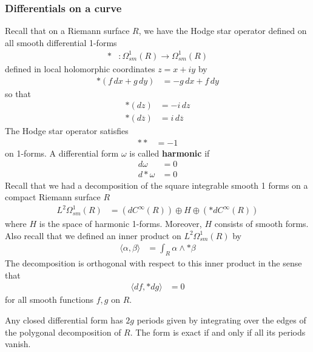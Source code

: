 \documentclass[12pt]{article}
\begin{document}
\subsubsection{Differentials on a curve}
Recall that on a Riemann surface $R$, we have the Hodge star operator defined on all smooth differential 1-forms \begin{align*}
    * & : \Omega^1_{sm}(R) \to \Omega^1_{sm}(R)
\end{align*} defined in local holomorphic coordinates $z = x + iy$ by \begin{align*}
    *(f\,dx + g\,dy) & = -g\,dx + f\,dy
\end{align*} so that \begin{align*}
    *(dz)            & = -i\, dz           \\
    *(d\overline{z}) & = i\, d\overline{z}
\end{align*} The Hodge star operator satisfies \begin{align*}
    ** & = -1
\end{align*} on 1-forms. A differential form $\omega$ is called \textbf{harmonic} if \begin{align*}
    d\omega    & = 0 \\
    d * \omega & = 0
\end{align*}
Recall that we had a decomposition of the square integrable smooth 1 forms on a compact Riemann surface $R$ \begin{align*}
    L^2 \Omega^1_{sm}(R) & = (dC^{\infty}(R)) \oplus H \oplus (*d C^{\infty}(R))
\end{align*} where $H$ is the space of harmonic 1-forms. Moreover, $H$ consists of smooth forms. Also recall that we defined an inner product on $L^2 \Omega^1_{sm}(R)$ by \begin{align*}
    \langle\alpha, \beta\rangle & = \int_R \alpha \wedge * \beta
\end{align*} The decomposition is orthogonal with respect to this inner product in the sense that \begin{align*}
    \langle d f, * d g\rangle & = 0
\end{align*} for all smooth functions $f,g$ on $R$.

Any closed differential form has $2g$ periods given by integrating over the edges of the polygonal decomposition of $R$. The form is exact if and only if all its periods vanish.
\end{document}
